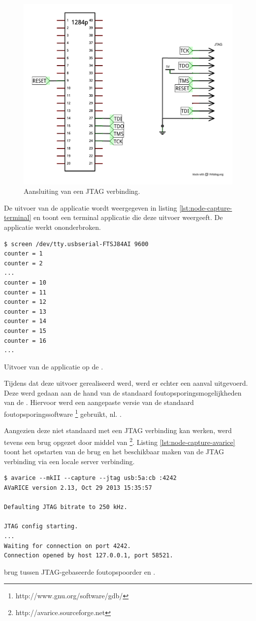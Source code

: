 \begin{figure}[ht]
  \centering
  \includegraphics[width=0.7\linewidth]{resources/node-capture-jtag.pdf}
  \caption{Aansluiting van een JTAG verbinding.}
  \label{fig:node-capture-jtag}
\end{figure}

De uitvoer van de applicatie wordt weergegeven in listing
\ref{lst:node-capture-terminal} en toont een terminal applicatie die deze
uitvoer weergeeft. De applicatie werkt ononderbroken.

\begin{listing}[ht]
  \begin{verbatim}
$ screen /dev/tty.usbserial-FTSJ84AI 9600
counter = 1
counter = 2
...
counter = 10
counter = 11
counter = 12
counter = 13
counter = 14
counter = 15
counter = 16
...
\end{verbatim}
  \caption{Uitvoer van de applicatie op de \mcu.}
  \label{lst:node-capture-terminal}
\end{listing}

Tijdens dat deze uitvoer gerealiseerd werd, werd er echter een aanval
uitgevoerd. Deze werd gedaan aan de hand van de standaard
foutopsporingsmogelijkheden van de \mcu. Hiervoor werd een aangepaste versie
van de standaard foutopsporingssoftware
\footnote{http://www.gnu.org/software/gdb/} gebruikt, nl.
.

Aangezien deze niet standaard met een JTAG verbinding kan werken, werd tevens
een brug opgezet door middel van
\footnote{http://avarice.sourceforge.net}. Listing
\ref{lst:node-capture-avarice} toont het opstarten van de brug en het
beschikbaar maken van de JTAG verbinding via een locale server verbinding.

\begin{listing}[ht]
  \begin{verbatim}
$ avarice --mkII --capture --jtag usb:5a:cb :4242
AVaRICE version 2.13, Oct 29 2013 15:35:57

Defaulting JTAG bitrate to 250 kHz.

JTAG config starting.
...
Waiting for connection on port 4242.
Connection opened by host 127.0.0.1, port 58521.
  \end{verbatim}
  \caption{ brug tussen JTAG-gebaseerde foutopspoorder en .}
  \label{lst:node-capture-avarice}
\end{listing}

